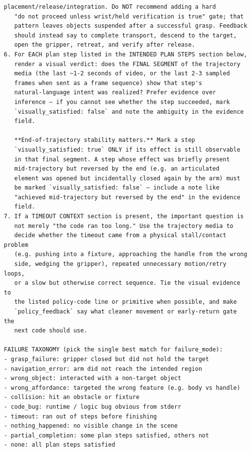 \begin{lstlisting}[style=ratsappendixprompt]
   placement/release/integration. Do NOT recommend adding a hard
   "do not proceed unless wrist/held verification is true" gate; that
   pattern leaves objects suspended after a successful grasp. Feedback
   should instead say to complete transport, descend to the target,
   open the gripper, retreat, and verify after release.
6. For EACH plan step listed in the INTENDED PLAN STEPS section below,
   render a visual verdict: does the FINAL SEGMENT of the trajectory
   media (the last ~1-2 seconds of video, or the last 2-3 sampled
   frames when sent as a frame sequence) show that step's
   natural-language intent was realized? Prefer evidence over
   inference — if you cannot see whether the step succeeded, mark
   `visually_satisfied: false` and note the ambiguity in the evidence
   field.

   **End-of-trajectory stability matters.** Mark a step
   `visually_satisfied: true` ONLY if its effect is still observable
   in that final segment. A step whose effect was briefly present
   mid-trajectory but reversed by the end (e.g. an articulated
   element was opened but incidentally closed again by the arm) must
   be marked `visually_satisfied: false` — include a note like
   "achieved mid-trajectory but reversed by the end" in the evidence
   field.
7. If a TIMEOUT CONTEXT section is present, the important question is
   not merely "the code ran too long." Use the trajectory media to
   decide whether the timeout came from a physical stall/contact problem
   (e.g. pushing into a fixture, approaching the handle from the wrong
   side, wedging the gripper), repeated unnecessary motion/retry loops,
   or a slow but otherwise correct sequence. Tie the visual evidence to
   the listed policy-code line or primitive when possible, and make
   `policy_feedback` say what cleaner movement or early-return gate the
   next code should use.

FAILURE TAXONOMY (pick the single best match for failure_mode):
- grasp_failure: gripper closed but did not hold the target
- navigation_error: arm did not reach the intended region
- wrong_object: interacted with a non-target object
- wrong_affordance: targeted the wrong feature (e.g. body vs handle)
- collision: hit an obstacle or fixture
- code_bug: runtime / logic bug obvious from stderr
- timeout: ran out of steps before finishing
- nothing_happened: no visible change in the scene
- partial_completion: some plan steps satisfied, others not
- none: all plan steps satisfied


\end{lstlisting}
